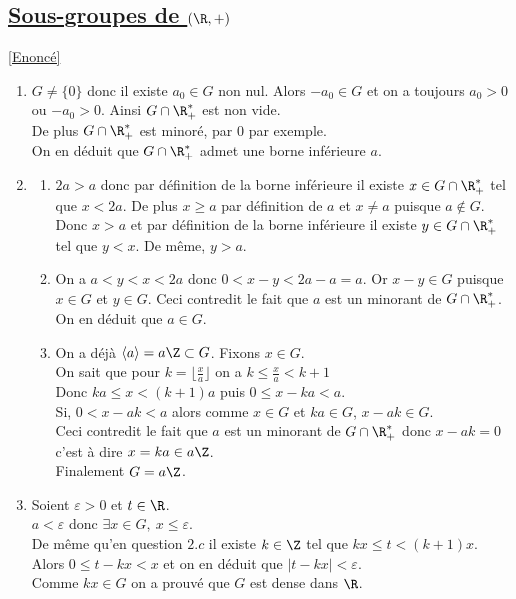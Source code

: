 \documentclass[8pt]{book}
\begin{document}
	\subsection{\underline{Sous-groupes de $(\R,+)$} }
	\label{Sous-groupes de R corrigé}
	\textcolor{blue}{\hyperref[Sous-groupes de (R,+)]{[Enoncé]}}\\
	\begin{enumerate}
		\item $G\ne\{0\}$ donc il existe $a_0\in G$ non nul. Alors $-a_0\in G$ et on a toujours $a_0>0$ ou $-a_0>0$. Ainsi $G\cap \R^*_+$ est non vide.\\
		De plus $G\cap \R^*_+$ est minoré, par $0$ par exemple.\\
		On en déduit que $G\cap\R^*_+$ admet une borne inférieure $a$.
		\item \begin{enumerate}[label=\alph*.]
			\item $2a>a$ donc par définition de la borne inférieure il existe $x\in G\cap \R^*_+$ tel que $x<2a$. De plus $x\geq a$ par définition de $a$ et $x\ne a$ puisque $a\notin G$. Donc $x>a$ et par définition de la borne inférieure il existe $y\in G\cap \R^*_+$ tel que $y<x$. De même, $y>a$.
			\item On a $a<y<x<2a$ donc $0<x-y<2a-a=a$. Or $x-y\in G$ puisque $x\in G$ et $y\in G$. Ceci contredit le fait que $a$ est un minorant de $G\cap \R^*_+$.\\
			On en déduit que $a\in G$.
			\item On a déjà $\langle a\rangle=a\Z\subset G$. Fixons $x\in G$.\\
			On sait que pour $k=\lfloor\frac{x}{a}\rfloor$ on a $k\leq \displaystyle\frac{x}{a}<k+1$\\
			Donc $ka\leq x<(k+1)a$ puis $0\leq x-ka<a$.\\
			Si, $0<x-ak<a$ alors comme $x\in G$ et $ka\in G$, $x-ak\in G$.\\
			Ceci contredit le fait que $a$ est un minorant de $G\cap\R^*_+$ donc $x-ak=0$ c'est à dire $x=ka\in a\Z$.\\
			Finalement $G=a\Z$.
		\end{enumerate}
		\item Soient $\varepsilon>0$ et $t\in \R$.\\
		$a<\varepsilon$ donc $\exists x\in G,\ x\leq\varepsilon$.\\
		De même qu'en question $2.c$ il existe $k\in \Z$ tel que $kx\leq t<(k+1)x$.\\
		Alors $0\leq t-kx<x$ et on en déduit que $|t-kx|<\varepsilon$.\\
		Comme $kx\in G$ on a prouvé que $G$ est dense dans $\R$.
	\end{enumerate}
	
\end{document}
